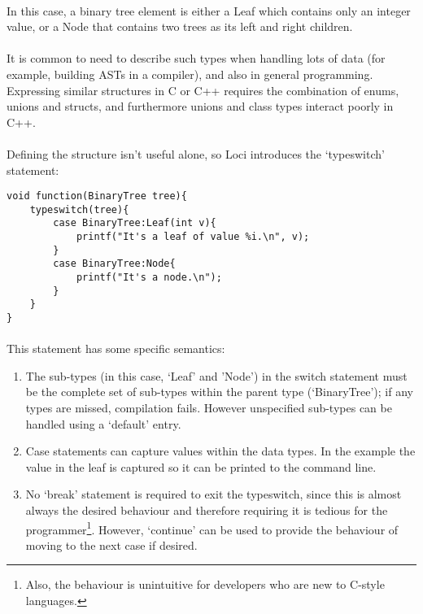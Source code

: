 \documentclass[12pt,twoside,notitlepage]{report}
\begin{document}
\paragraph{}
In this case, a binary tree element is either a Leaf which contains only an integer value, or a Node that contains two trees as its left and right children.

\paragraph{}
It is common to need to describe such types when handling lots of data (for example, building ASTs in a compiler), and also in general programming. Expressing similar structures in C or C++ requires the combination of enums, unions and structs, and furthermore unions and class types interact poorly in C++.

\paragraph{}
Defining the structure isn't useful alone, so Loci introduces the `typeswitch' statement:

\small{
\begin{verbatim}
void function(BinaryTree tree){
    typeswitch(tree){
        case BinaryTree:Leaf(int v){
            printf("It's a leaf of value %i.\n", v);
        }
        case BinaryTree:Node{
            printf("It's a node.\n");
        }
    }
}
\end{verbatim}
}

\paragraph{}
This statement has some specific semantics:

\begin{enumerate}
\item The sub-types (in this case, `Leaf' and 'Node') in the switch statement must be the complete set of sub-types within the parent type (`BinaryTree'); if any types are missed, compilation fails. However unspecified sub-types can be handled using a `default' entry.
\item Case statements can capture values within the data types. In the example the value in the leaf is captured so it can be printed to the command line.
\item No `break' statement is required to exit the typeswitch, since this is almost always the desired behaviour and therefore requiring it is tedious for the programmer\footnote{Also, the behaviour is unintuitive for developers who are new to C-style languages.}. However, `continue' can be used to provide the behaviour of moving to the next case if desired.
\end{enumerate}
\end{document}
